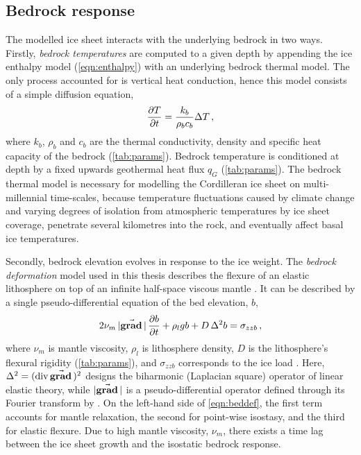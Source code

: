 \documentclass[a4paper]{kappa}
\newcommand{\vect}[1]{\va*{#1}} %
\renewcommand{\div}[1]{\mathrm{div}\,#1}            %
\renewcommand{\grad}[1]{\vect{\mathrm{grad}}\,#1}   %
\begin{document}
\subsection{Bedrock response}

The modelled ice sheet interacts with the underlying bedrock in two ways.
Firstly, \emph{bedrock temperatures} are computed to a given depth by
appending the
ice enthalpy model (\ref{eqn:enthalpy}) with an underlying bedrock thermal
model. The only process accounted for is vertical heat conduction, hence this model
consists of a simple diffusion equation,
\begin{equation}
    \pdv{T}{t} = \frac{k_b}{\rho_b c_b} \Delta T \,,
\end{equation}
where $k_b$, $\rho_b$ and $c_b$ are the thermal conductivity, density and
specific heat capacity of the bedrock (\cref{tab:params}).
Bedrock temperature is conditioned at depth by a fixed upwards geothermal heat
flux $q_G$  (\cref{tab:params}). The bedrock thermal model
is necessary for modelling the Cordilleran ice sheet on multi-millennial
time-scales, because temperature fluctuations caused by climate change and
varying degrees of isolation from atmospheric temperatures by ice sheet
coverage, penetrate several kilometres
into the rock, and eventually affect basal ice temperatures.

Secondly, bedrock elevation evolves in response to the ice weight. The
\emph{bedrock deformation} model used in this thesis describes the flexure of
an elastic
lithosphere on top of an infinite half-space viscous mantle
\citep{Lingle.Clark.1985}. It can be described by a single pseudo-differential
equation of the bed elevation, $b$,
\begin{equation}
    \label{eqn:beddef}
    2\nu_m\,|\grad|\,\pdv{b}{t} + \rho_l g b + D\,\Delta^2 b = \sigma_{zzb} \,,
\end{equation}
where $\nu_m$ is mantle viscosity, $\rho_l$ is lithosphere density, $D$ is the
lithosphere's flexural rigidity (\cref{tab:params}), and $\sigma_{zzb}$
corresponds to the ice load
\citep{Bueler.etal.2007}. Here, ${\Delta^2 = (\div\grad{})^2}$ designs the
biharmonic (Laplacian square) operator of
linear elastic theory, while $|\grad{}|$ is a pseudo-differential operator
defined through its Fourier transform by \citet[Eq.~6]{Bueler.etal.2007}. On
the left-hand side of \cref{eqn:beddef}, the first term accounts for mantle
relaxation, the second for point-wise isostasy, and the third for elastic
flexure. Due to high mantle viscosity, $\nu_m$, there exists a time lag between
the ice sheet growth and the isostatic bedrock response.
\end{document}
